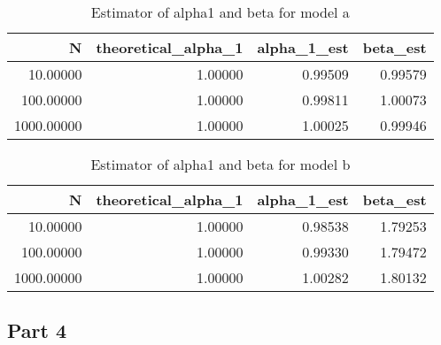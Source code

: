 \documentclass[12pt, a4paper]{article}\usepackage[]{graphicx}\usepackage[]{color}
\begin{document}
\begin{table}[ht]
\centering
\begin{tabular}{rrrr}
  \hline
N & theoretical\_alpha\_1 & alpha\_1\_est & beta\_est \\ 
  \hline
10.00000 & 1.00000 & 0.99509 & 0.99579 \\ 
  100.00000 & 1.00000 & 0.99811 & 1.00073 \\ 
  1000.00000 & 1.00000 & 1.00025 & 0.99946 \\ 
   \hline
\end{tabular}
\caption{Estimator of alpha1 and beta for model a} 
\end{table}
\begin{table}[ht]
\centering
\begin{tabular}{rrrr}
  \hline
N & theoretical\_alpha\_1 & alpha\_1\_est & beta\_est \\ 
  \hline
10.00000 & 1.00000 & 0.98538 & 1.79253 \\ 
  100.00000 & 1.00000 & 0.99330 & 1.79472 \\ 
  1000.00000 & 1.00000 & 1.00282 & 1.80132 \\ 
   \hline
\end{tabular}
\caption{Estimator of alpha1 and beta for model b} 
\end{table}




\subsection{Part 4}
\end{document}
